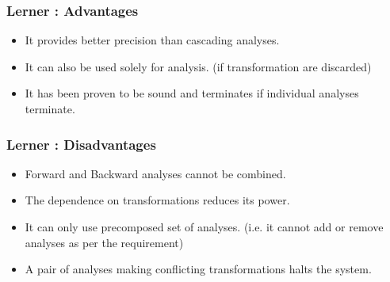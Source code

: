 \begin{frame}
  \frametitle{Lerner : Advantages}
    \begin{itemize}
        \item It provides better precision than cascading analyses.

        \item It can also be used solely for analysis. (if transformation are discarded)

        \item It has been proven to be sound and terminates if individual analyses terminate.
    \end{itemize}
\end{frame}


\begin{frame}
  \frametitle{Lerner : Disadvantages}
    \begin{itemize}
        \item Forward and Backward analyses cannot be combined.

        \item The dependence on transformations reduces its power.

        \item It can only use precomposed set of analyses. (i.e. it cannot add or remove analyses as per the requirement)

        \item A pair of analyses making conflicting transformations halts the system.
    \end{itemize}
\end{frame}





